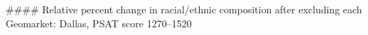 #### Relative percent change in racial/ethnic composition after excluding each Geomarket: Dallas, PSAT score 1270–1520
